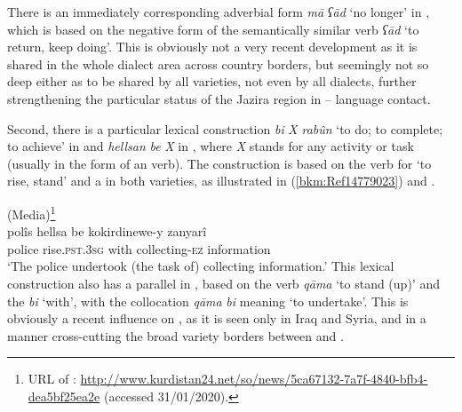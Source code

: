 \documentclass[output=paper]{langsci/langscibook}
\begin{document}
There is an immediately corresponding adverbial form \textit{mā} \textit{ʕād} ‘no longer’ in , which is based on the negative form of the semantically similar verb \textit{ʕād} ‘to return, keep doing’. This is obviously not a very recent development as it is shared in the whole dialect area across country borders, but seemingly not so deep either as to be shared by all  varieties, not even by all   dialects, further strengthening the particular status of the Jazira region in -- language contact. 

Second, there is a particular lexical construction \textit{bi} \textit{X} \textit{rabûn} ‘to do; to complete; to achieve’ in   and \textit{hellsan} \textit{be} \textit{X} in  , where \textit{X} stands for any activity or task (usually in the form of an  verb). The construction is based on the verb for ‘to rise, stand’ and a  in both varieties, as illustrated in (\ref{bkm:Ref14779023}) and .

\ea {}  (Media)\label{bkm:Ref14779023}\footnote{URL of : \url{http://www.kurdistan24.net/so/news/5ca67132-7a7f-4840-bfb4-dea5bf25ea2e} (accessed 31/01/2020).}\\
\gll polîs hellsa be kokirdinewe-y zanyarî\\
     police rise.\textsc{pst.3sg} with collecting-\textsc{ez} information\\
\glt ‘The police undertook (the task of) collecting information.’\z
{}
This lexical construction also has a parallel in  , based on the verb \textit{qāma} ‘to stand (up)’ and the  \textit{bi} ‘with’, with the collocation \textit{qāma} \textit{bi} meaning ‘to undertake’. This is obviously a recent influence on , as it is seen only in Iraq and Syria, and in a manner cross-cutting the broad variety borders between  and . 
\end{document}
